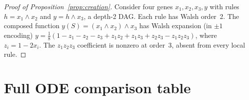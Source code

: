 \documentclass[10pt]{article}
\begin{document}
\begin{proof}[Proof of Proposition~\ref{prop:creation}]
Consider four genes $x_1, x_2, x_3, y$ with rules
$h = x_1 \wedge x_2$ and $y = h \wedge x_3$, a depth-2 DAG. Each
rule has Walsh order~2. The composed function
$y(S) = (x_1 \wedge x_2) \wedge x_3$ has Walsh expansion (in
$\pm 1$ encoding)
$y = \tfrac{1}{8}(1 - z_1 - z_2 - z_3 + z_1 z_2 + z_1 z_3
+ z_2 z_3 - z_1 z_2 z_3)$,
where $z_i = 1 - 2x_i$. The $z_1 z_2 z_3$ coefficient is nonzero
at order~3, absent from every local rule.
\end{proof}


\section{Full ODE comparison table}
\label{supp:ode-table}
\end{document}
